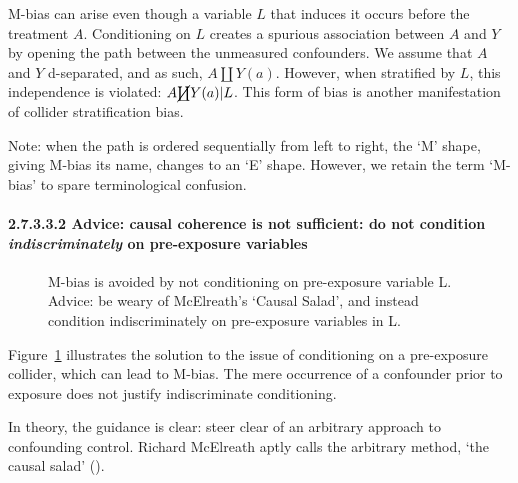 \documentclass[
  singlecolumn]{article}
\let\oldparagraph\paragraph
\renewcommand{\paragraph}[1]{\oldparagraph{#1}\mbox{}}
\begin{document}
M-bias can arise even though a variable \(L\) that induces it occurs
before the treatment \(A\). Conditioning on \(L\) creates a spurious
association between \(A\) and \(Y\) by opening the path between the
unmeasured confounders. We assume that \(A\) and \(Y\) d-separated, and
as such, \(A \coprod Y(a)\). However, when stratified by \(L\), this
independence is violated: \(A \cancel{\coprod} Y(a)| L\). This form of
bias is another manifestation of collider stratification bias.

Note: when the path is ordered sequentially from left to right, the `M'
shape, giving M-bias its name, changes to an `E' shape. However, we
retain the term `M-bias' to spare terminological confusion.

\paragraph{\texorpdfstring{2.7.3.3.2 Advice: causal coherence is not
sufficient: do not condition \emph{indiscriminately} on pre-exposure
variables}{2.7.3.3.2 Advice: causal coherence is not sufficient: do not condition indiscriminately on pre-exposure variables}}\label{advice-causal-coherence-is-not-sufficient-do-not-condition-indiscriminately-on-pre-exposure-variables}

\begin{figure}


\caption{\label{fig-m-bias-solution}M-bias is avoided by not
conditioning on pre-exposure variable L. Advice: be weary of McElreath's
`Causal Salad', and instead condition indiscriminately on pre-exposure
variables in L.}

\end{figure}%

Figure~\ref{fig-m-bias-solution} illustrates the solution to the issue
of conditioning on a pre-exposure collider, which can lead to M-bias.
The mere occurrence of a confounder prior to exposure does not justify
indiscriminate conditioning.

In theory, the guidance is clear: steer clear of an arbitrary approach
to confounding control. Richard McElreath aptly calls the arbitrary
method, `the causal salad' ().
\end{document}
